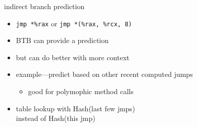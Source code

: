 \begin{frame}{indirect branch prediction}
    \begin{itemize}
    \item \texttt{jmp *\%rax} or \texttt{jmp *(\%rax, \%rcx, 8)}
    \item BTB can provide a prediction
    \item but can do better with more context
    \item example---predict based on other recent computed jumps
        \begin{itemize}
        \item good for polymophic method calls
        \end{itemize}
    \vspace{.5cm}
    \item table lookup with Hash(last few jmps) \\
        instead of Hash(this jmp)
    \end{itemize}
\end{frame}
